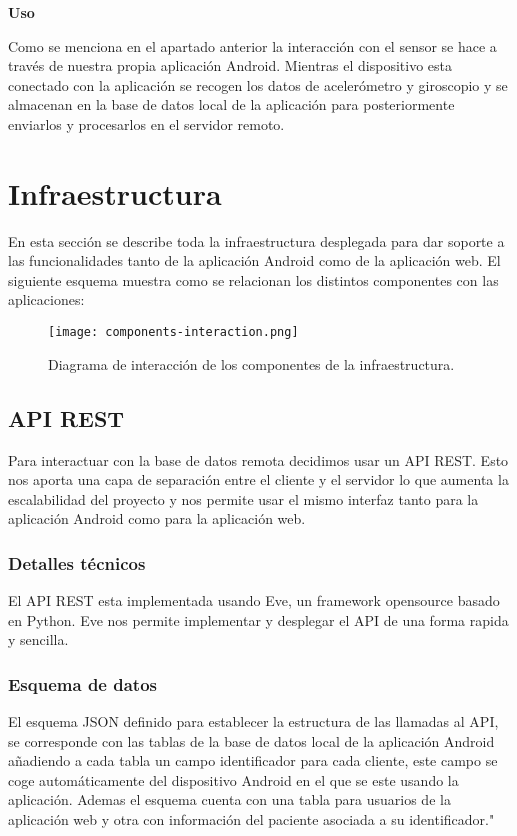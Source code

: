\documentclass[11pt,spanish]{article}
\begin{document}
{\bf Uso}
\newline

Como se menciona en el apartado anterior la interacción con el sensor se hace a través de nuestra propia aplicación Android. Mientras el dispositivo esta conectado con la aplicación se recogen los datos de acelerómetro y giroscopio y se almacenan en la base de datos local de la aplicación para posteriormente enviarlos y procesarlos en el servidor remoto.

\newpage
\section{Infraestructura}
En esta sección se describe toda la infraestructura desplegada para dar soporte a las funcionalidades tanto de la aplicación Android como de la aplicación web. El siguiente esquema muestra como se relacionan los distintos componentes con las aplicaciones:

\begin{figure}[H]
  \centering
  \texttt{[image: components-interaction.png]}
  \caption{Diagrama de interacción de los componentes de la infraestructura.}
\end{figure}


\subsection{API REST}
Para interactuar con la base de datos remota decidimos usar un API REST. Esto nos aporta una capa de separación entre el cliente y el servidor lo que aumenta la escalabilidad del proyecto y nos permite usar el mismo interfaz tanto para la aplicación Android como para la aplicación web.

\subsubsection{Detalles técnicos}
El API REST esta implementada usando Eve, un framework opensource basado en Python. Eve nos permite implementar y desplegar el API de una forma rapida y sencilla.

\subsubsection{Esquema de datos}

El esquema JSON definido para establecer la estructura de las llamadas al API, se corresponde con las tablas de la base de datos local de la aplicación Android añadiendo a cada tabla un campo identificador para cada cliente, este campo se coge automáticamente del dispositivo Android en el que se este usando la aplicación. Ademas el esquema cuenta con una tabla para usuarios de la aplicación web y otra con información del paciente asociada a su identificador."
\end{document}
